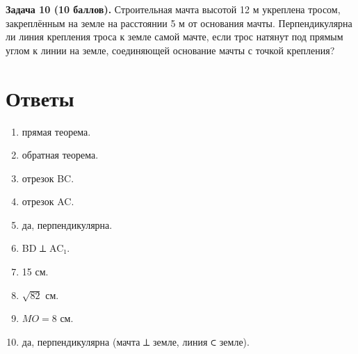 \documentclass{umk-matematika}
\begin{document}
\textbf{Задача 10 (10 баллов).} Строительная мачта высотой 12 м укреплена тросом, закреплённым на земле на расстоянии 5 м от основания мачты. Перпендикулярна ли линия крепления троса к земле самой мачте, если трос натянут под прямым углом к линии на земле, соединяющей основание мачты с точкой крепления?

\newpage
\section*{Ответы}

\begin{enumerate}
  \item прямая теорема.
  \item обратная теорема.
  \item отрезок BC.
  \item отрезок AC.
  \item да, перпендикулярна.
  \item BD ⟂ AC₁.
  \item 15 см.
  \item $\sqrt{82}$ см.
  \item $MO = 8$ см.
  \item да, перпендикулярна (мачта ⟂ земле, линия ⊂ земле).
\end{enumerate}
\end{document}
